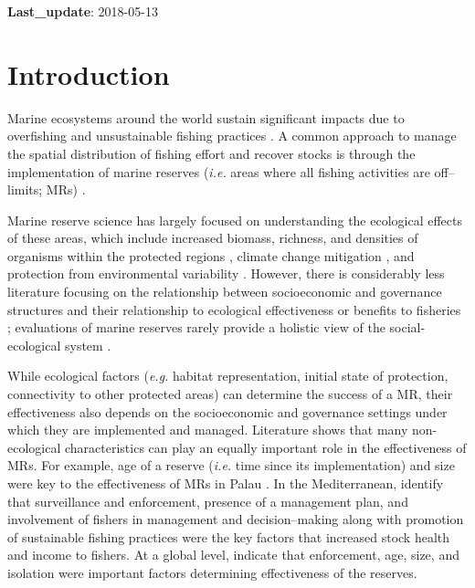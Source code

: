 \documentclass{frontiersSCNS}
\theoremstyle{definition}
\theoremstyle{definition}
\theoremstyle{definition}
\theoremstyle{remark}
\begin{document}
\textbf{Last\_update}: 2018-05-13

\clearpage

\section{Introduction}\label{introduction}

Marine ecosystems around the world sustain significant impacts due to
overfishing and unsustainable fishing practices
\citep{halpern_2008-dK,worm_2006-IB,pauly_2005-qV}. A common approach to
manage the spatial distribution of fishing effort and recover stocks is
through the implementation of marine reserves (\emph{i.e.} areas where
all fishing activities are off--limits; MRs)
\citep{afflerbach_2014-HP,krueck_2017-J1,sala_2017-69}.

Marine reserve science has largely focused on understanding the
ecological effects of these areas, which include increased biomass,
richness, and densities of organisms within the protected regions
\citep{lester_2009-Ks,giakoumi_2017-V2,sala_2017-69}, climate change
mitigation \citep{roberts_2017-J9}, and protection from environmental
variability \citep{micheli_2012-EU}. However, there is considerably less
literature focusing on the relationship between socioeconomic and
governance structures and their relationship to ecological effectiveness
\citep{halpern_2013,lpezangarita_2014,mascia_2017-m_} or benefits to
fisheries \citep{krueck_2017-J1}; evaluations of marine reserves rarely
provide a holistic view of the social-ecological system
\citep{lpezangarita_2014}.

While ecological factors (\emph{e.g.} habitat representation, initial
state of protection, connectivity to other protected areas) can
determine the success of a MR, their effectiveness also depends on the
socioeconomic and governance settings under which they are implemented
and managed. Literature shows that many non-ecological characteristics
can play an equally important role in the effectiveness of MRs. For
example, age of a reserve (\emph{i.e.} time since its implementation)
and size were key to the effectiveness of MRs in Palau
\citep{friedlander_2017-oI}. In the Mediterranean,
\citet{difranco_2016-Xw} identify that surveillance and enforcement,
presence of a management plan, and involvement of fishers in management
and decision--making along with promotion of sustainable fishing
practices were the key factors that increased stock health and income to
fishers. At a global level, \citet{edgar_2014-UO} indicate that
enforcement, age, size, and isolation were important factors determining
effectiveness of the reserves.
\end{document}
